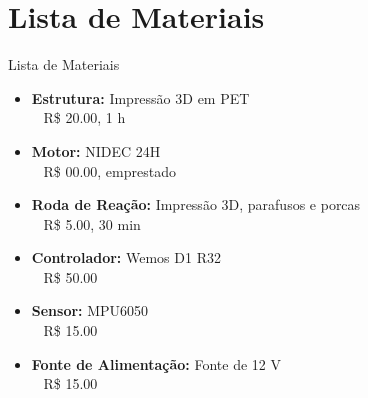 \section{Lista de Materiais}

\begin{frame}{Lista de Materiais}
    \begin{itemize}
        \item \textbf{Estrutura:} Impressão 3D em PET \\
            ~ R\$ 20.00, 1 h
        \item \textbf{Motor:} NIDEC 24H \\
            ~ R\$ 00.00, emprestado
        \item \textbf{Roda de Reação:} Impressão 3D, parafusos e porcas \\
            ~ R\$ 5.00, 30 min
        \item \textbf{Controlador:} Wemos D1 R32 \\
            ~ R\$ 50.00
        \item \textbf{Sensor:} MPU6050 \\
            ~ R\$ 15.00
        \item \textbf{Fonte de Alimentação:} Fonte de 12 V \\
            ~ R\$ 15.00
    \end{itemize}
\end{frame}
